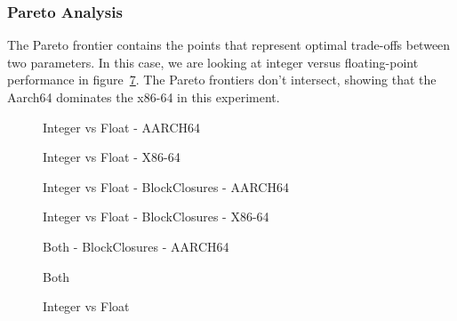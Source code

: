 \documentclass[manuscript,screen,review,sigplan]{acmart}
\begin{document}
\subsubsection{Pareto Analysis}
The Pareto frontier contains the points that represent optimal trade-offs between two parameters.
In this case, we are looking at integer versus floating-point performance in figure~\ref{pareto}.
The Pareto frontiers don't intersect, showing that the Aarch64 dominates the x86-64 in this experiment.
\begin{figure}[htbp]
    \centering
    \aarchScatterPlot
    \caption{Integer vs Float - AARCH64}
    \label{paretoA}
\end{figure}
\begin{figure}[htbp]
    \centering
    \xScatterPlot
    \caption{Integer vs Float - X86-64}
    \label{paretoX}
\end{figure}
\begin{figure}[htbp]
    \centering
    \aarchScatterPlotClosure
    \caption{Integer vs Float - BlockClosures - AARCH64}
    \label{paretoAC}
\end{figure}
\begin{figure}[htbp]
    \centering
    \xScatterPlotClosure
    \caption{Integer vs Float - BlockClosures - X86-64}
    \label{paretoXC}
\end{figure}
\begin{figure}[htbp]
    \centering
    \aarchScatterPlotBoth
    \caption{Both - BlockClosures - AARCH64}
    \label{paretoAB}
\end{figure}
\begin{figure}[htbp]
    \centering
    \xScatterPlotBoth
    \caption{Both}
    \label{paretoxB}
\end{figure}
\begin{figure}[htbp]
    \centering
    \scatterPlotRaw
    \caption{Integer vs Float}
    \label{pareto}
\end{figure}

\end{document}
